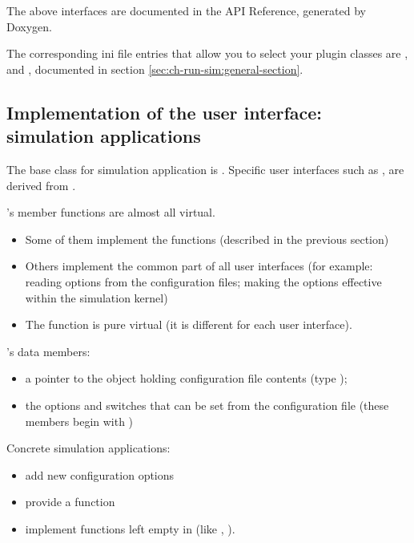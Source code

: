 The above interfaces are documented in the API Reference, generated by Doxygen.

The corresponding ini file entries that allow you to select your
plugin classes are ,
 and ,
documented in section \ref{sec:ch-run-sim:general-section}.



\subsection{Implementation of the user interface: simulation applications}

The base class for simulation application is .
Specific user interfaces such as ,
 are derived from .

's member functions are almost all virtual.
\begin{itemize}
  \item{Some of them implement the  functions
    (described in the previous section)}
  \item{Others implement the common part of all user interfaces (for
    example: reading options from the configuration files; making the
    options effective within the simulation kernel)}
  \item{The  function is pure virtual (it is different
    for each user interface).}
\end{itemize}

's data members:
\begin{itemize}
  \item{a pointer to the object holding configuration file contents
    (type );}
  \item{the options and switches that can be set from the
    configuration file (these members begin with )}
\end{itemize}

Concrete simulation applications:
\begin{itemize}
  \item{add new configuration options}
  \item{provide a  function}
  \sloppy
  \item{implement functions left empty in  (like
    , ).}
\end{itemize}


%
%
%

